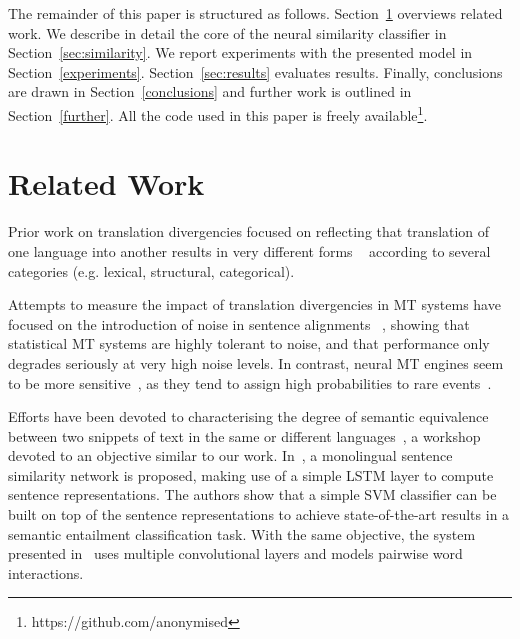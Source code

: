 \documentclass[11pt,a4paper]{article}
\begin{document}
The remainder of this paper is structured as follows. 
Section~\ref{related} overviews related work. 
We describe in detail the core of the neural similarity classifier in Section~\ref{sec:similarity}. 
We report experiments with the presented model in Section~\ref{experiments}.
Section~\ref{sec:results} evaluates results. 
Finally, conclusions are drawn in Section~\ref{conclusions} and further work is outlined in Section~\ref{further}.
All the code used in this paper is freely available\footnote{https://github.com/anonymised}.

\section{Related Work}
\label{related}


Prior work on translation divergencies focused on reflecting that translation of one language into another results in very different forms ~\cite{J94-4004} according to several categories (e.g. lexical, structural, categorical). 

Attempts to measure the impact of translation divergencies in MT systems have focused on the introduction of noise in sentence alignments ~\cite{goute2012}, showing that statistical MT systems are highly tolerant to noise, and that performance only degrades seriously at very high noise levels. 
In contrast, neural MT engines seem to be more sensitive~\cite{chen2016adaptation}, as they tend to assign high probabilities to rare events~\cite{Hassan2018AchievingHP}.

Efforts have been devoted to characterising the degree of semantic equivalence between two snippets of text in the same or different languages~\cite{conf/semeval/AgirreBCDGMRW16}, a workshop devoted to an objective similar to our work. 
In~\cite{Mueller:2016:SRA:3016100.3016291}, a monolingual sentence similarity network is proposed, making use of a simple LSTM layer to compute sentence representations. 
The authors show that a simple SVM classifier can be built on top of the sentence representations to achieve state-of-the-art results in a semantic entailment classification task. 
With the same objective, the system presented in~\cite{N16-1108} uses multiple convolutional layers and models pairwise word interactions. %
\end{document}
